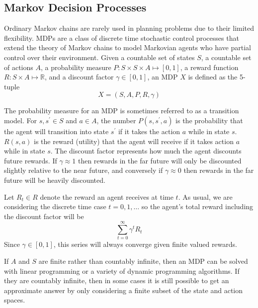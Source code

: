 \documentclass[tog]{acmsiggraph}
\begin{document}
\subsection{Markov Decision Processes}

Ordinary Markov chains are rarely used in planning problems due to their 
limited flexibility. MDPs are a class of discrete time stochastic control 
processes that extend the theory of Markov chains to model Markovian agents 
who have partial control over their environment. Given a countable set of 
states $S$, a countable set of actions $A$, a probability measure 
$P : S \times S \times A \mapsto \left[0, 1 \right]$, a reward function 
$R : S \times A \mapsto \mathbb{R}$, and a discount factor $\gamma \in \left[0, 1 \right]$,
an MDP $X$ is defined as the 5-tuple
\begin{equation*}
  X = \left(S, A, P, R, \gamma \right)
\end{equation*}

The probability measure for an MDP is sometimes referred to as a transition
 model. For $s, s^\prime \in S $ and $a \in A$, the number $P \left(s, s^\prime , a \right)$
 is the probability that the agent will transition into state $s^\prime$ 
if it takes the action $a$ while in state $s$. $R \left( s, a \right)$ is 
the reward (utility) that the agent will receive if it takes action $a$ while 
in state $s$. The discount factor represents how much the agent discounts 
future rewards. If $\gamma \approx 1$ then rewards in the far future will 
only be discounted slightly relative to the near future, and conversely if 
$\gamma \approx 0$ then rewards in the far future will be heavily discounted.

Let $R_t \in R$ denote the reward an agent receives at time $t$. As usual, 
we are considering the discrete time case $t = 0, 1, \ldots$ so the agent's 
total reward including the discount factor will be
\begin{equation*}
  \sum_{t=0}^\infty \gamma^t R_t
\end{equation*}
Since $\gamma \in \left[0, 1 \right]$, this series will always converge given 
finite valued rewards.

If $A$ and $S$ are finite rather than countably infinite, then an MDP can be solved with 
linear programming or a variety of dynamic programming algorithms. If they are countably 
infinite, then in some cases it is still possible to get an approximate answer by only 
considering a finite subset of the state and action spaces.
\end{document}
